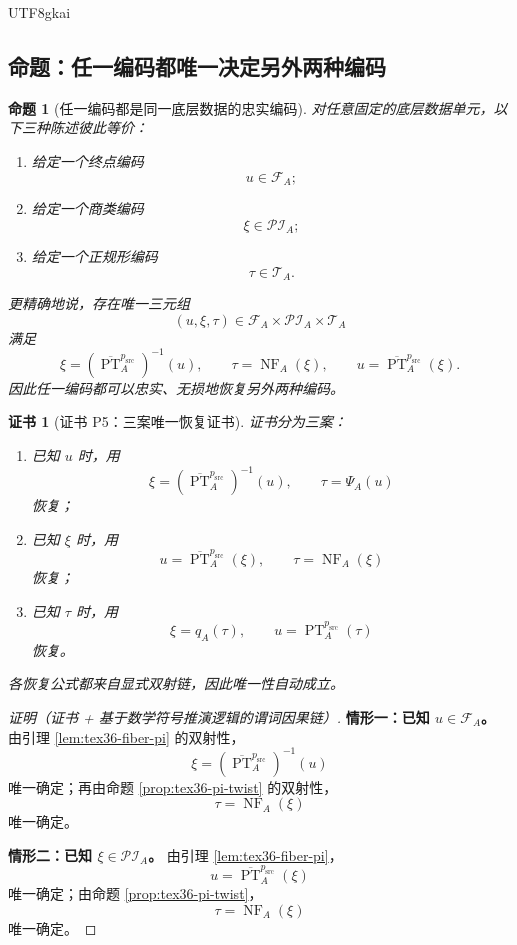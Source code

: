 \documentclass[12pt]{article}
\newtheorem{proposition}{命题}[section]
\newtheorem{Certificate}{证书}[section]
\newcommand{\PT}{\operatorname{PT}}
\newcommand{\NF}{\operatorname{NF}}
\begin{document}
\begin{CJK*}{UTF8}{gkai}
\subsection{命题：任一编码都唯一决定另外两种编码}
\label{subsec:tex36-each-code-determines-all}

\begin{proposition}[任一编码都是同一底层数据的忠实编码]
\label{prop:tex36-faithful-code}
对任意固定的底层数据单元，以下三种陈述彼此等价：
\begin{enumerate}
  \item 给定一个终点编码
  \[
    u\in \mathcal F_A;
  \]
  \item 给定一个商类编码
  \[
    \xi\in \mathcal{PI}_A;
  \]
  \item 给定一个正规形编码
  \[
    \tau\in \mathcal T_A.
  \]
\end{enumerate}
更精确地说，存在唯一三元组
\[
  (u,\xi,\tau)\in \mathcal F_A\times \mathcal{PI}_A\times \mathcal T_A
\]
满足
\[
  \xi=(\overline{\PT}_A^{p_{\mathrm{src}}})^{-1}(u),
  \qquad
  \tau=\NF_A(\xi),
  \qquad
  u=\overline{\PT}_A^{p_{\mathrm{src}}}(\xi).
\]
因此任一编码都可以忠实、无损地恢复另外两种编码。
\end{proposition}

\begin{Certificate}[证书 P5：三案唯一恢复证书]
\label{cert:tex36-p5}
证书分为三案：
\begin{enumerate}
  \item 已知 $u$ 时，用
  \[
    \xi=(\overline{\PT}_A^{p_{\mathrm{src}}})^{-1}(u),
    \qquad
    \tau=\Psi_A(u)
  \]
  恢复；
  \item 已知 $\xi$ 时，用
  \[
    u=\overline{\PT}_A^{p_{\mathrm{src}}}(\xi),
    \qquad
    \tau=\NF_A(\xi)
  \]
  恢复；
  \item 已知 $\tau$ 时，用
  \[
    \xi=q_A(\tau),
    \qquad
    u=\PT_A^{p_{\mathrm{src}}}(\tau)
  \]
  恢复。
\end{enumerate}
各恢复公式都来自显式双射链，因此唯一性自动成立。
\end{Certificate}

\begin{proof}[证明（证书 + 基于数学符号推演逻辑的谓词因果链）]
\textbf{情形一：已知 $u\in\mathcal F_A$。}
由引理 \ref{lem:tex36-fiber-pi} 的双射性，
\[
  \xi=(\overline{\PT}_A^{p_{\mathrm{src}}})^{-1}(u)
\]
唯一确定；再由命题 \ref{prop:tex36-pi-twist} 的双射性，
\[
  \tau=\NF_A(\xi)
\]
唯一确定。

\textbf{情形二：已知 $\xi\in\mathcal{PI}_A$。}
由引理 \ref{lem:tex36-fiber-pi}，
\[
  u=\overline{\PT}_A^{p_{\mathrm{src}}}(\xi)
\]
唯一确定；由命题 \ref{prop:tex36-pi-twist}，
\[
  \tau=\NF_A(\xi)
\]
唯一确定。


\end{proof}
\end{CJK*}
\end{document}
